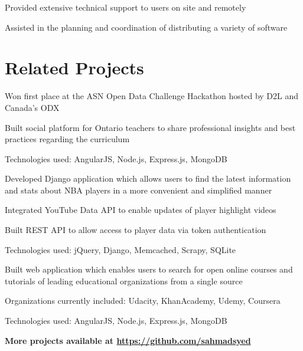 \documentclass[letterpaper]{deedy-resume}
\begin{document}
\begin{minipage}[t]{0.66\textwidth}
\sectionspace


\begin{tightitemize}
\item Provided extensive technical support to users on site and remotely
\item Assisted in the planning and coordination of distributing a variety of software
\end{tightitemize}

\sectionspace

\section{Related Projects}

\location{}
\begin{tightitemize}
\item Won first place at the ASN Open Data Challenge Hackathon hosted by D2L and Canada's ODX
\item Built social platform for Ontario teachers to share professional insights and best practices regarding the curriculum
\item Technologies used: AngularJS, Node.js, Express.js, MongoDB
\end{tightitemize}
\sectionspace

\location{}
\begin{tightitemize}
\item Developed Django application which allows users to find the latest information and stats about NBA players in a more convenient and simplified manner
\item Integrated YouTube Data API to enable updates of player highlight videos
\item Built REST API to allow access to player data via token authentication
\item Technologies used: jQuery, Django, Memcached, Scrapy, SQLite
\end{tightitemize}
\sectionspace

\location{}
\begin{tightitemize}
\item Built web application which enables users to search for open online courses and tutorials of leading educational organizations from a single source
\item Organizations currently included: Udacity, KhanAcademy, Udemy, Coursera
\item Technologies used: AngularJS, Node.js, Express.js, MongoDB
\end{tightitemize}
\sectionspace

\textbf{More projects available at \href{https://github.com/sahmadsyed}{https://github.com/sahmadsyed}}

\end{minipage} %
\end{document}
